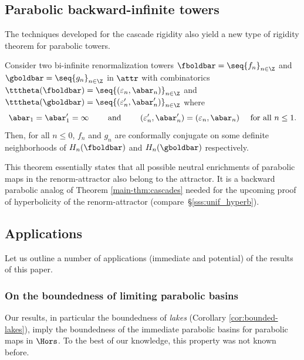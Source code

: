 \documentclass{amsart}
\begin{document}
\subsection{Parabolic backward-infinite towers}

The techniques developed for the cascade rigidity also yield a new type of rigidity theorem for parabolic towers.

\begin{thmx}
    \label{main-thm:backward-rigidity}
    Consider two bi-infinite renormalization towers $\fboldbar = \seq{f_n}_{n \in \Z}$ and $\gboldbar = \seq{g_n}_{n \in \Z}$ in $\attr$ with combinatorics 
    $\tttheta(\fboldbar) = \seq{ (\varepsilon_n, \abar_n) }_{n \in \Z}$
    and $\tttheta(\gboldbar)=\seq{ (\varepsilon'_n, \abar'_n) }_{n \in \Z}$ where
\[
    \abar_1 = \abar'_1 = \infty
    \qquad \text{ and } \qquad (\varepsilon'_n, \abar'_n) = (\varepsilon_n, \abar_n) \quad \text{ for all } n \leq 1.
\]
    Then, for all $n \leq 0$, $f_n$ and $g_n$ are conformally conjugate on some definite neighborhoods of $H_n(\fboldbar)$ and $H_n(\gboldbar)$ respectively. 
\end{thmx}

This theorem essentially states that all possible neutral enrichments of parabolic maps in the renorm-attractor also belong to the attractor.
It is a backward parabolic analog of Theorem \ref{main-thm:cascades}
needed for  the upcoming proof of  hyperbolicity of the renorm-attractor 
(compare~\S\ref{sss:unif_hyperb}). 


\subsection{Applications}\label{ss:intro:appl} 

Let us outline a number of applications 
(immediate and potential) of the results of this paper.


\subsubsection{On the boundedness of limiting parabolic basins} 
Our results, in particular the boundedness of \emph{lakes} (Corollary \ref{cor:bounded-lakes}), 
imply the boundedness of the immediate parabolic basins for parabolic maps in $\Hors$.
To the best of our knowledge, this property was not known before.
\end{document}
